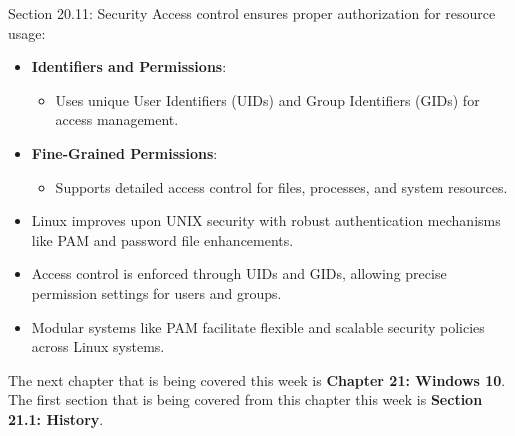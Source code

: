 \begin{notes}{Section 20.11: Security}
    Access control ensures proper authorization for resource usage:
    \begin{itemize}
        \item \textbf{Identifiers and Permissions}:
        \begin{itemize}
            \item Uses unique User Identifiers (UIDs) and Group Identifiers (GIDs) for access management.
        \end{itemize}
        \item \textbf{Fine-Grained Permissions}:
        \begin{itemize}
            \item Supports detailed access control for files, processes, and system resources.
        \end{itemize}
    \end{itemize}
    
    \begin{highlight}
        \begin{itemize}
            \item Linux improves upon UNIX security with robust authentication mechanisms like PAM and password file enhancements.
            \item Access control is enforced through UIDs and GIDs, allowing precise permission settings for users and groups.
            \item Modular systems like PAM facilitate flexible and scalable security policies across Linux systems.
        \end{itemize}
    \end{highlight}
\end{notes}

The next chapter that is being covered this week is \textbf{Chapter 21: Windows 10}. The first section that is being covered from this chapter this week is \textbf{Section 21.1: History}.

